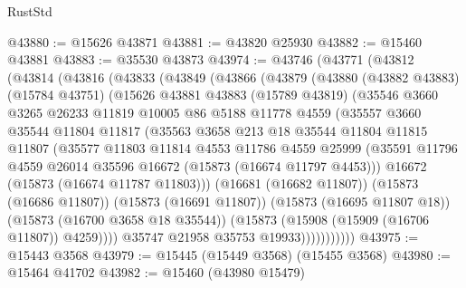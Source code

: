 \begin{lexlean}{RustStd}
\begin{coremodule}
@43880 := @15626 @43871
@43881 := @43820 @25930
@43882 := @15460 @43881
@43883 := @35530 @43873
@43974 := @43746
    (@43771
      (@43812
        (@43814
          (@43816
            (@43833
              (@43849
                (@43866
                  (@43879
                    (@43880
                      (@43882 @43883)
                      (@15784 @43751)
                      (@15626
                        @43881
                        @43883
                        (@15789 @43819)
                        (@35546
                          @3660
                          @3265
                          @26233
                          @11819
                          @10005
                          @86
                          @5188
                          @11778
                          @4559
                          (@35557
                            @3660
                            @35544
                            @11804
                            @11817
                            (@35563
                              @3658
                              @213
                              @18
                              @35544
                              @11804
                              @11815
                              @11807
                              (@35577
                                @11803
                                @11814
                                @4553
                                @11786
                                @4559
                                @25999
                                (@35591
                                  @11796
                                  @4559
                                  @26014
                                  @35596
                                  @16672
                                  (@15873 (@16674 @11797 @4453)))
                                @16672
                                (@15873 (@16674 @11787 @11803)))
                              (@16681 (@16682 @11807))
                              (@15873 (@16686 @11807))
                              (@15873 (@16691 @11807))
                              (@15873 (@16695 @11807 @18))
                              (@15873 (@16700 @3658 @18 @35544))
                              (@15873 (@15908 (@15909 (@16706 @11807)) @4259))))
                          @35747
                          @21958
                          @35753
                          @19933)))))))))))
@43975 := @15443 @3568
@43979 := @15445 (@15449 @3568) (@15455 @3568)
@43980 := @15464 @41702
@43982 := @15460 (@43980 @15479)

\end{coremodule}
\end{lexlean}
